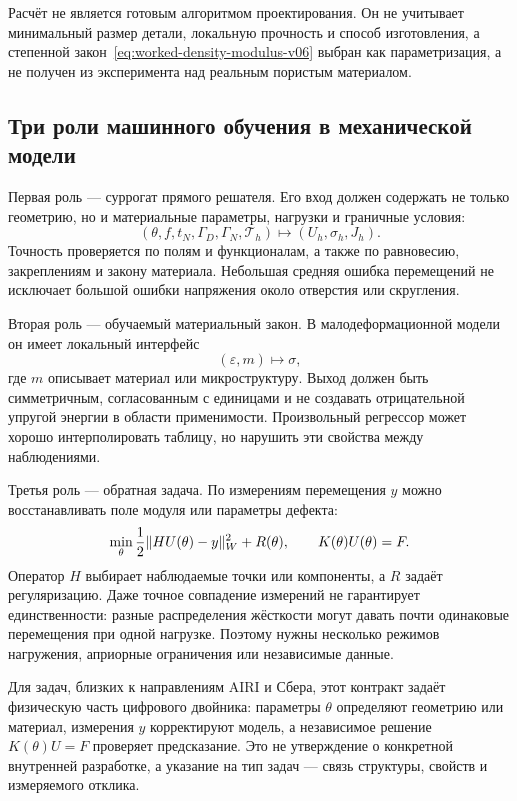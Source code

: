 Расчёт не является готовым алгоритмом проектирования. Он не учитывает минимальный размер детали, локальную прочность и способ изготовления, а степенной закон~\eqref{eq:worked-density-modulus-v06} выбран как параметризация, а не получен из эксперимента над реальным пористым материалом.

\subsection{Три роли машинного обучения в механической модели}

Первая роль --- суррогат прямого решателя. Его вход должен содержать не только геометрию, но и материальные параметры, нагрузки и граничные условия:
\begin{equation}
\label{eq:elastic-surrogate-contract-v06}
 (\theta,f,t_N,\Gamma_D,\Gamma_N,\mathcal T_h)
 \longmapsto
 (U_h,\sigma_h,J_h).
\end{equation}
Точность проверяется по полям и функционалам, а также по равновесию, закреплениям и закону материала. Небольшая средняя ошибка перемещений не исключает большой ошибки напряжения около отверстия или скругления.

Вторая роль --- обучаемый материальный закон. В малодеформационной модели он имеет локальный интерфейс
\begin{equation}
\label{eq:learned-constitutive-contract-v06}
 (\varepsilon,m)
 \longmapsto
 \sigma,
\end{equation}
где $m$ описывает материал или микроструктуру. Выход должен быть симметричным, согласованным с единицами и не создавать отрицательной упругой энергии в области применимости. Произвольный регрессор может хорошо интерполировать таблицу, но нарушить эти свойства между наблюдениями.

Третья роль --- обратная задача. По измерениям перемещения $y$ можно восстанавливать поле модуля или параметры дефекта:
\begin{equation}
\label{eq:elastic-inverse-problem-v06}
 \min_{\theta}
 \frac12\lVert H U(\theta)-y\rVert_{W}^2
 +R(\theta),
 \qquad
 K(\theta)U(\theta)=F.
\end{equation}
Оператор $H$ выбирает наблюдаемые точки или компоненты, а $R$ задаёт регуляризацию. Даже точное совпадение измерений не гарантирует единственности: разные распределения жёсткости могут давать почти одинаковые перемещения при одной нагрузке. Поэтому нужны несколько режимов нагружения, априорные ограничения или независимые данные.

Для задач, близких к направлениям AIRI и Сбера, этот контракт задаёт физическую часть цифрового двойника: параметры $\theta$ определяют геометрию или материал, измерения $y$ корректируют модель, а независимое решение $K(\theta)U=F$ проверяет предсказание. Это не утверждение о конкретной внутренней разработке, а указание на тип задач --- связь структуры, свойств и измеряемого отклика.

